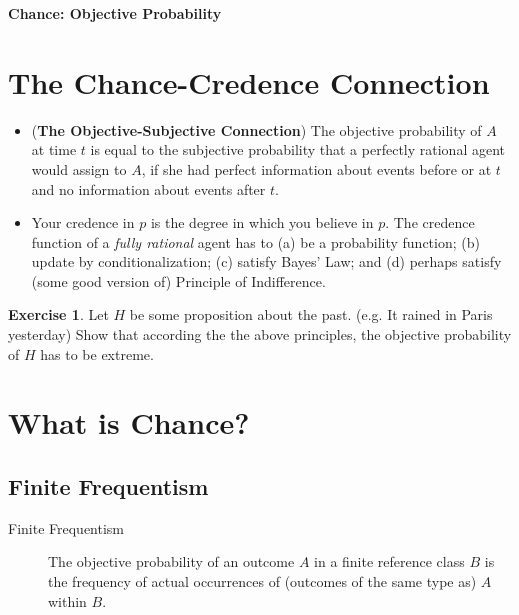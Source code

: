\documentclass[12pt]{article}
\theoremstyle{definition}
\newtheorem{exer}{Exercise}
\begin{document}


\begin{center}
{\Large \bf Chance: Objective Probability}
\end{center}

\smallskip

\section{The Chance-Credence Connection}

\begin{itemize}
\item (\textbf{The Objective-Subjective Connection}) The objective probability of $A$ at time $t$ is equal to the subjective probability that a perfectly rational agent would assign to $A$, if she had perfect information about events before or at $t$ and no information about events after $t$.
\item Your credence in $p$ is the degree in which you believe in $p$. The credence function of a \textit{fully rational} agent has to (a) be a probability function; (b) update by conditionalization; (c) satisfy Bayes' Law; and (d) perhaps satisfy (some good version of) Principle of Indifference.
\end{itemize}

\begin{exer}
Let $H$ be some proposition about the past. (e.g. It rained in Paris yesterday) Show that according the the above principles, the objective probability of $H$ has to be extreme.
\end{exer}

\section{What is Chance?}

\subsection{Finite Frequentism}

\begin{description}
\item[Finite Frequentism] The objective probability of an outcome $A$ in a finite reference class $B$ is the frequency of actual occurrences of (outcomes of the same type as) $A$ within $B$.
\end{description}
\end{document}
